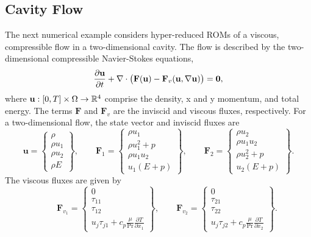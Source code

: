 \subsection{Cavity Flow}
The next numerical example considers hyper-reduced ROMs of a viscous, compressible flow in a two-dimensional cavity. 
The flow is described by the two-dimensional compressible Navier-Stokes equations,
\begin{equation}\label{eq:compressible_ns}
\frac{\partial \mathbf{u}}{\partial t} + \nabla \cdot \big( \mathbf{F}(\mathbf{u} ) - \mathbf{F}_v (\mathbf{u},\nabla \mathbf{u} )      \big) =\boldsymbol 0,
\end{equation}
where $\mathbf{u}: [0,T] \times \Omega \rightarrow \mathbb{R}^{4}$ comprise the density, x and y momentum, and total energy. The terms $\mathbf{F}$ and $ \mathbf{F}_v$ are the inviscid and viscous fluxes, respectively. For a two-dimensional flow, the state vector and inviscid fluxes are
$$
\mathbf{u} = \begin{Bmatrix}
\rho \\ \rho u_1 \\ \rho u_2 \\ \rho E \end{Bmatrix}, \qquad \mathbf{F}_{1} = \begin{Bmatrix} \rho u_1 \\ \rho u_1^2 +      p \\ \rho u_1 u_2 \\ u_1(E + p) \end{Bmatrix}, 
\qquad \mathbf{F}_{2} = \begin{Bmatrix} \rho u_2 \\ \rho u_1 u_2  \\ \rho u_2^2 + p \\ u_2(E + p) \end{Bmatrix}.
$$
The viscous fluxes are given by
$$
\qquad \mathbf{F}_{v_1} = \begin{Bmatrix} 0 \\ \tau_{11} \\ \tau_{12}  \\ u_j \tau_{j1} + c_p \frac{\mu}{\text{Pr}} \frac{\partial T}{\partial x_1}  \end{Bmatrix}, 
\qquad \mathbf{F}_{v_2} = \begin{Bmatrix} 0 \\ \tau_{21} \\ \tau_{22}  \\ u_j \tau_{j2} + c_p \frac{\mu}{\text{Pr}} \frac{\partial T}{\partial x_2}  \end{Bmatrix}.
$$
